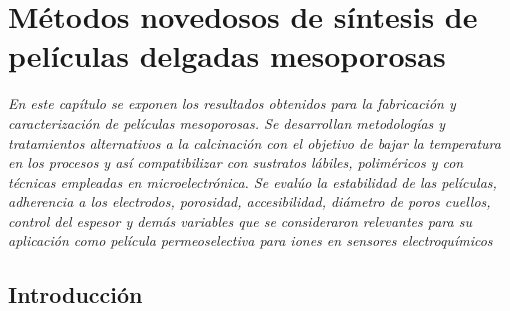  \newcommand{\NoBiblioMeso}[1]{
 \ifthenelse{\equal{#1}{verdadero}}{}{}
 \NoBiblioMeso{verdadero}}

 
 \FormatoCapituloDosLineas
 
 \chapter{Métodos novedosos de síntesis de películas delgadas mesoporosas}
 \label{chap:Mesoporosos}

 \thispagestyle{empty}
	
 \noindent\textit{En este capítulo se exponen los resultados obtenidos para la fabricación y caracterización de películas mesoporosas. Se desarrollan metodologías y tratamientos alternativos a la calcinación con el objetivo de bajar la temperatura en los procesos y así compatibilizar con sustratos lábiles, poliméricos y con técnicas empleadas en microelectrónica. Se evalúo la estabilidad de las películas, adherencia a los electrodos, porosidad, accesibilidad, diámetro de poros cuellos, control del espesor y demás variables que se consideraron relevantes para su aplicación como película permeoselectiva para iones en sensores electroquímicos}
 
 \vfill
 \minitoc
 \newpage

\section{Introducción}

